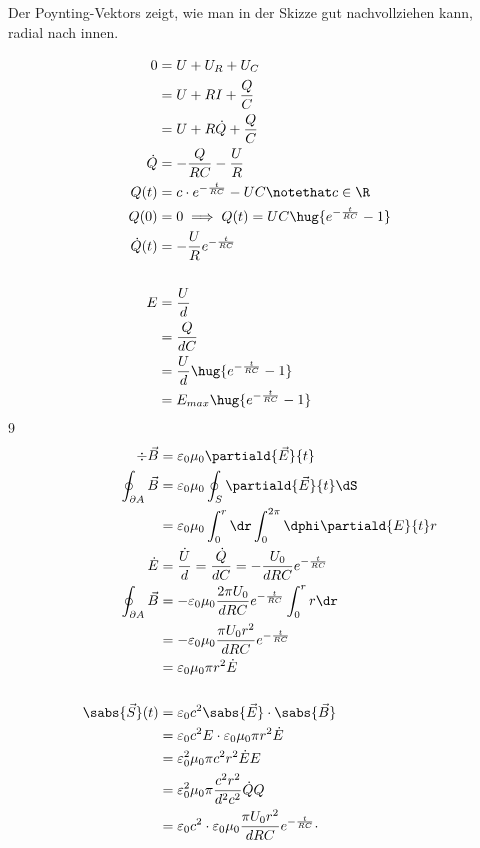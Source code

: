 \documentclass[11pt]{article}
\begin{document}
\subsection{}
\begin{adjustwidth}{20pt}{}
    Der Poynting-Vektors zeigt, wie man in der Skizze gut nachvollziehen kann, 
    radial nach innen.
\end{adjustwidth}
\begin{align*}
    0 &= U + U_R + U_C\\
    &= U + R I + \frac{Q}{C}\\
    &= U + R \dot Q + \frac{Q}{C}\\
    \dot Q &= - \frac{Q}{RC} - \frac{U}{R}\\
    Q(t) &= c\cdot e^{-\frac{t}{RC}} - UC \notethat c\in\R\\
    Q(0) &= 0 \implies Q(t) = UC \hug{e^{-\frac{t}{RC}} - 1} \\
    \dot Q(t) &= - \frac UR e^{-\frac{t}{RC}}\\
    \\
    E &= \frac{U}{d}\\
    &= \frac{Q}{d C}\\
    &= \frac {U}d \hug{e^{-\frac{t}{RC}} - 1}\\
    &= E_{max} \hug{e^{-\frac{t}{RC}} - 1}
\end{align*}9
\begin{align*}
    \div \vec B &= \varepsilon_0 \mu_0 \partiald{\vec E}{t}\\
    \oint_{\partial A}\vec B &= \varepsilon_0 \mu_0 \oint_S \partiald{\vec E}{t}\dS\\
    &= \varepsilon_0 \mu_0 \int_{0}^{r}\dr \int_{0}^{2\pi}\dphi \partiald{E}{t}r\\
    \dot E &= \frac {\dot U}d = \frac{\dot Q}{dC} = - \frac {U_0}{dRC} e^{-\frac{t}{RC}}\\
    \oint_{\partial A}\vec B &= -\varepsilon_0 \mu_0 \frac {2\pi U_0}{dRC} e^{-\frac{t}{RC}}\int_{0}^{r}r \dr\\
    &= -\varepsilon_0 \mu_0 \frac {\pi U_0 r^2}{dRC} e^{-\frac{t}{RC}}\\
    &= \varepsilon_0 \mu_0 \pi r^2\dot E\\
    \\
    \sabs{\vec S}(t) &=  \varepsilon_0 c^2 \sabs{\vec E}\cdot\sabs{\vec B}\\
    &= \varepsilon_0 c^2 E\cdot \varepsilon_0 \mu_0 \pi r^2\dot E\\
    &= \varepsilon_0^2 \mu_0 \pi c^2 r^2 \dot E E\\
    &= \varepsilon_0^2 \mu_0 \pi \frac{c^2 r^2}{d^2c^2} \dot Q Q\\
    &= \varepsilon_0 c^2\cdot \varepsilon_0 \mu_0 \frac {\pi U_0 r^2}{dRC} e^{-\frac{t}{RC}} \cdot \\  
\end{align*}
\end{document}
